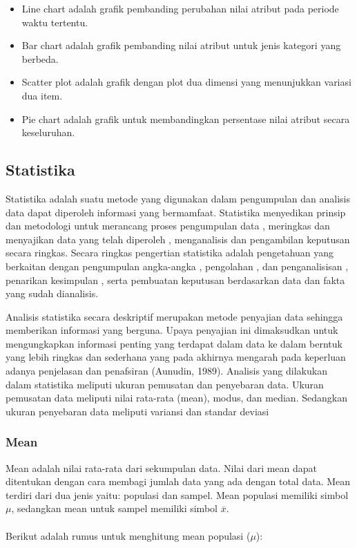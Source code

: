 \begin{itemize}
\item Line chart adalah grafik pembanding perubahan nilai atribut pada periode waktu tertentu.
\item Bar chart adalah grafik pembanding nilai atribut untuk jenis kategori yang berbeda.
\item Scatter plot adalah grafik dengan plot dua dimensi yang menunjukkan variasi dua item.
\item Pie chart adalah grafik untuk membandingkan persentase nilai atribut secara keseluruhan.
\end{itemize}

\subsection{Statistika}
Statistika adalah suatu metode yang digunakan dalam pengumpulan dan analisis data dapat diperoleh informasi yang bermamfaat. Statistika menyedikan prinsip dan metodologi untuk merancang proses pengumpulan data , meringkas dan menyajikan data yang telah diperoleh , menganalisis dan pengambilan keputusan secara ringkas. Secara ringkas pengertian statistika adalah pengetahuan yang berkaitan dengan pengumpulan angka-angka , pengolahan , dan penganalisisan , penarikan kesimpulan , serta pembuatan keputusan berdasarkan data dan fakta yang sudah dianalisis.

Analisis statistika secara deskriptif merupakan metode penyajian data sehingga memberikan informasi yang berguna. Upaya penyajian ini dimaksudkan untuk mengungkapkan informasi penting yang terdapat dalam data ke dalam berntuk yang lebih ringkas dan sederhana yang pada akhirnya mengarah pada keperluan adanya penjelasan dan penafsiran (Aunudin, 1989). Analisis yang dilakukan dalam statistika meliputi ukuran pemusatan dan penyebaran data. Ukuran pemusatan data meliputi nilai rata-rata (mean), modus, dan median. Sedangkan ukuran penyebaran data meliputi variansi dan standar deviasi

\subsubsection{Mean}
Mean adalah nilai rata-rata dari sekumpulan data. Nilai dari mean dapat ditentukan dengan cara membagi jumlah data yang ada dengan total data. Mean terdiri dari dua jenis yaitu: populasi dan sampel. Mean populasi memiliki simbol $\mu$, sedangkan mean untuk sampel memiliki simbol $\overline{x}$.   
\\\\
Berikut adalah rumus untuk menghitung mean populasi ($\mu$):

